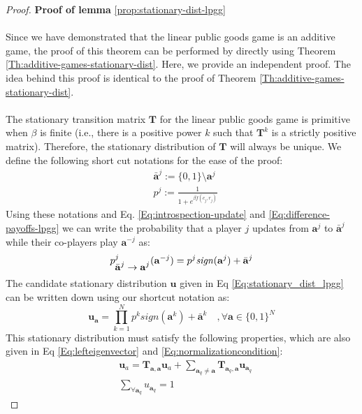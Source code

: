 \documentclass[11pt]{article}
\theoremstyle{plainCl1}
\theoremstyle{plainCl2}
\newcommand{\abf}{\mathbf{a}}
\newcommand{\T}{\mathbf{T}}
\newcommand{\ubf}{\mathbf{u}}
\begin{document}
\begin{proof}
\textbf{Proof of lemma} \ref{prop:stationary-dist-lpgg} \\ \\
Since we have demonstrated that the linear public goods game is an additive game, the proof of this theorem can be performed by directly using Theorem \ref{Th:additive-games-stationary-dist}. Here, we provide an independent proof. The idea behind this proof is identical to the proof of Theorem \ref{Th:additive-games-stationary-dist}. \\ \\
\noindent The stationary transition matrix $\T$ for the linear public goods game is primitive when $\beta$ is finite (i.e., there is a positive power $k$ such that $\T^k$ is a strictly positive matrix). Therefore, the stationary distribution of $\T$ will always be unique. We define the following short cut notations for the ease of the proof: 
\begin{eqnarray}
&\bar{\abf}^j := \{0,1\} \setminus \abf^j  \\ 
&p^j := \frac{1}{1 + \displaystyle e^{\beta f(c_j, r_j)}}
\end{eqnarray}
Using these notations and Eq. \ref{Eq:introspection-update} and \ref{Eq:difference-payoffs-lpgg} we can write the probability that a player $j$ updates from $\abf^j$ to $\bar{\abf}^j$ while their co-players play $\abf^{-j}$ as:
\begin{equation}
p^j_{\displaystyle \bar{\abf}^j  \to \abf^j} (\abf^{-j}) = p^j \mathit{sign}(\abf^j) + \bar{\abf}^j \\ \\
\end{equation}
The candidate stationary distribution $\ubf$ given in Eq \ref{Eq:stationary_dist_lpgg} can be written down using our shortcut notation as: 
\begin{equation}
\label{Eq:stationary-dist-shortcut}
\ubf_\abf = \prod_{k = 1}^{N}  p^k \mathit{sign}(\abf^k) + \bar{\abf}^k \quad ,\forall \abf \in \{0,1\}^N
\end{equation}
This stationary distribution must satisfy the following properties, which are also given in Eq  \ref{Eq:lefteigenvector} and \ref{Eq:normalizationcondition}:
\begin{align}
\label{Eq:transition-in-proof}
&\ubf_a = \T_{\abf,\abf} \ubf_a  + \sum_{\abf_q \neq \abf} \T_{\abf_q, \abf} \ubf_{\abf_q}  \\ 
\label{Eq:normalization-in-proof}
&\sum_{\forall \abf_q} u_{\abf_q}= 1
\end{align}

\end{proof}
\end{document}
